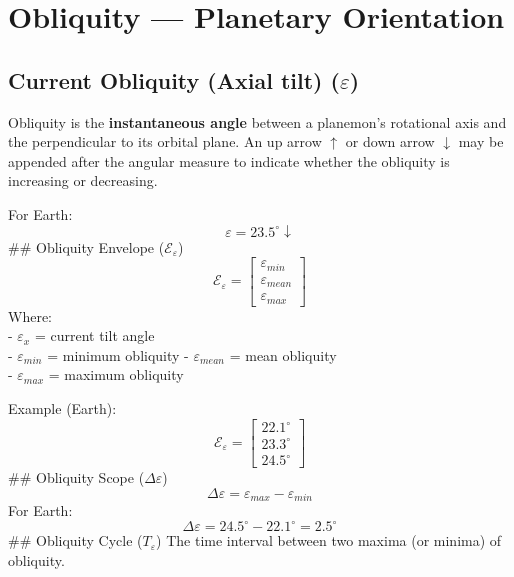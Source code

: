 \documentclass[
  letterpaper,
]{book}
\begin{document}
\chapter{Obliquity --- Planetary
Orientation}\label{obliquity-planetary-orientation}

\section{\texorpdfstring{Current Obliquity (Axial tilt)
(\(\varepsilon\))}{Current Obliquity (Axial tilt) (\textbackslash varepsilon)}}\label{current-obliquity-axial-tilt-varepsilon}

Obliquity is the \textbf{instantaneous angle} between a planemon's
rotational axis and the perpendicular to its orbital plane. An up arrow
\(\uparrow\) or down arrow \(\downarrow\) may be appended after the
angular measure to indicate whether the obliquity is increasing or
decreasing.

For Earth:\\
\[
\varepsilon = 23.5^\circ\downarrow
\] \#\# Obliquity Envelope (\(\mathcal{E}_\varepsilon\)) \[
\mathcal{E}_\varepsilon =
\begin{bmatrix}
\varepsilon_{min} \\
\varepsilon_{mean} \\
\varepsilon_{max}
\end{bmatrix}
\] Where:\\
- \(\varepsilon_x\) = current tilt angle\\
- \(\varepsilon_{min}\) = minimum obliquity - \(\varepsilon_{mean}\) =
mean obliquity\\
- \(\varepsilon_{max}\) = maximum obliquity

Example (Earth):\\
\[
\mathcal{E}_\varepsilon = 
\begin{bmatrix}
22.1^\circ \\
23.3^\circ \\
24.5^\circ
\end{bmatrix}
\] \#\# Obliquity Scope (\(\Delta\varepsilon\)) \[
\Delta\varepsilon = \varepsilon_{max} - \varepsilon_{min}
\] For Earth: \[
\Delta\varepsilon = 24.5^\circ - 22.1^\circ = 2.5^\circ
\] \#\# Obliquity Cycle (\(T_\varepsilon\)) The time interval between
two maxima (or minima) of obliquity.
\end{document}
